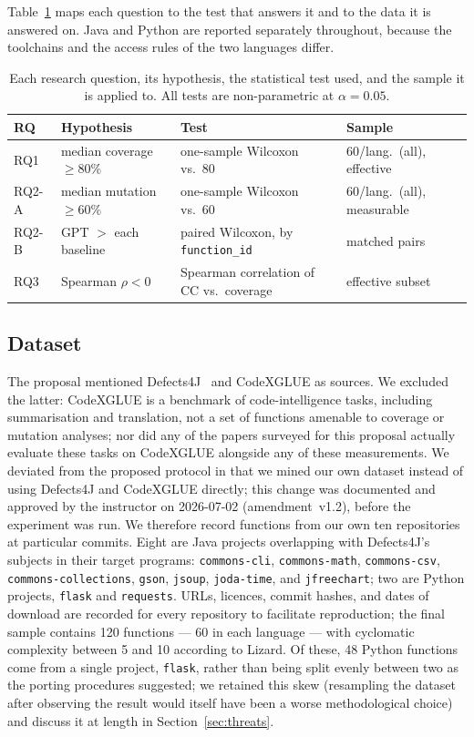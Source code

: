 Table~\ref{tab:rqmap} maps each question to the test that answers it and to the data it is
answered on. Java and Python are reported separately throughout, because the toolchains and
the access rules of the two languages differ.

\begin{table}[t]
\centering
\caption{Each research question, its hypothesis, the statistical test used, and the sample it
is applied to. All tests are non-parametric at $\alpha = 0.05$.}
\label{tab:rqmap}
\begin{tabular}{llll}
\hline
RQ & Hypothesis & Test & Sample \\
\hline
RQ1   & median coverage $\ge 80\%$ & one-sample Wilcoxon vs.\ 80 & 60/lang.\ (all), effective \\
RQ2-A & median mutation $\ge 60\%$ & one-sample Wilcoxon vs.\ 60 & 60/lang.\ (all), measurable \\
RQ2-B & GPT $>$ each baseline      & paired Wilcoxon, by \texttt{function\_id} & matched pairs \\
RQ3   & Spearman $\rho < 0$        & Spearman correlation of CC vs.\ coverage & effective subset \\
\hline
\end{tabular}
\end{table}

\subsection{Dataset}
The proposal mentioned Defects4J~\cite{just2014defects4j} and CodeXGLUE as sources. We excluded the latter:
CodeXGLUE is a benchmark of code-intelligence tasks, including summarisation and
translation, not a set of functions amenable to coverage or mutation analyses; nor did
any of the papers surveyed for this proposal actually evaluate these tasks on CodeXGLUE
alongside any of these measurements. We deviated from the proposed protocol in that we mined
our own dataset instead of using Defects4J and CodeXGLUE directly; this change was documented
and approved by the instructor on 2026-07-02 (amendment~v1.2), before the experiment was run.
We therefore record functions from our own ten repositories at particular commits. Eight are Java projects overlapping
with Defects4J's subjects in their target programs: \texttt{commons-cli},
\texttt{commons-math}, \texttt{commons-csv}, \texttt{commons-collections}, \texttt{gson},
\texttt{jsoup}, \texttt{joda-time}, and \texttt{jfreechart}; two are Python projects,
\texttt{flask} and \texttt{requests}. URLs, licences, commit hashes, and dates of
download are recorded for every repository to facilitate reproduction; the final sample
contains 120 functions --- 60 in each language --- with cyclomatic complexity between 5
and 10 according to Lizard. Of these, 48 Python functions come from a single project,
\texttt{flask}, rather than being split evenly between two as the porting procedures
suggested; we retained this skew (resampling the dataset after observing the result
would itself have been a worse methodological choice) and discuss it at length in
Section~\ref{sec:threats}.


